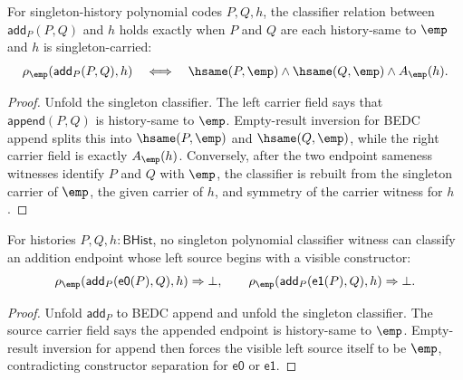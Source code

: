 \begin{theorem}
\label{thm:polynomial-singleton-classifier-add-split-empty}
For singleton-history polynomial codes $P,Q,h$, the classifier relation
between $\mathsf{add}_P(P,Q)$ and $h$ holds exactly when $P$ and $Q$
are each history-same to $\emp$ and $h$ is singleton-carried:
$$
\rho_{\emp}(\mathsf{add}_P(P,Q),h)
\quad\Longleftrightarrow\quad
\hsame(P,\emp)\wedge\hsame(Q,\emp)\wedge A_{\emp}(h).
$$
\end{theorem}
\begin{proof}
Unfold the singleton classifier. The left carrier field says that
$\mathsf{append}(P,Q)$ is history-same to $\emp$. Empty-result inversion
for BEDC append splits this into $\hsame(P,\emp)$ and $\hsame(Q,\emp)$,
while the right carrier field is exactly $A_{\emp}(h)$. Conversely, after
the two endpoint sameness witnesses identify $P$ and $Q$ with $\emp$,
the classifier is rebuilt from the singleton carrier of $\emp$, the given
carrier of $h$, and symmetry of the carrier witness for $h$.
\end{proof}

\begin{theorem}
\label{thm:polynomial-singleton-add-visible-left-absurd}
For histories $P,Q,h:\mathsf{BHist}$, no singleton polynomial classifier
witness can classify an addition endpoint whose left source begins with a
visible constructor:
$$
\rho_{\emp}(\mathsf{add}_P(\mathsf{e0}(P),Q),h)\Rightarrow\bot,
\qquad
\rho_{\emp}(\mathsf{add}_P(\mathsf{e1}(P),Q),h)\Rightarrow\bot.
$$
\end{theorem}
\begin{proof}
Unfold $\mathsf{add}_P$ to BEDC append and unfold the singleton classifier.
The source carrier field says the appended endpoint is history-same to
$\emp$. Empty-result inversion for append then forces the visible left source
itself to be $\emp$, contradicting constructor separation for
$\mathsf{e0}$ or $\mathsf{e1}$.
\end{proof}

